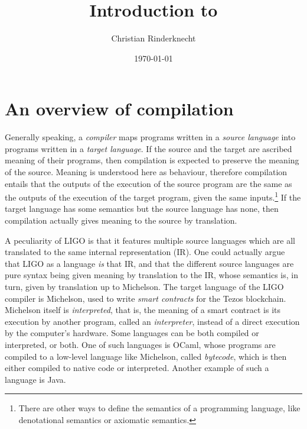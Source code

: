 \documentclass[12pt,a4paper]{article}
\title{Introduction to \ocamllex}
\author{\Large Christian Rinderknecht}
\date{\today}
\begin{document}
\maketitle


\section{An overview of compilation}

Generally speaking, a \emph{compiler} maps programs written in a
\emph{source language} into programs written in a \emph{target
  language}. If the source and the target are ascribed meaning of
their programs, then compilation is expected to preserve the meaning
of the source. Meaning is understood here as behaviour, therefore
compilation entails that the outputs of the execution of the source
program are the same as the outputs of the execution of the target
program, given the same inputs.\footnote{There are other ways to
  define the semantics of a programming language, like denotational
  semantics or axiomatic semantics.} If the target language has some
semantics but the source language has none, then compilation actually
gives meaning to the source by translation.

A peculiarity of LIGO is that it features multiple source languages
which are all translated to the same internal representation (IR). One
could actually argue that LIGO as a language \emph{is} that IR, and
that the different source languages are pure syntax being given
meaning by translation to the IR, whose semantics is, in turn, given
by translation up to Michelson. The target language of the LIGO
compiler is Michelson, used to write \emph{smart contracts} for the
Tezos blockchain. Michelson itself is \emph{interpreted}, that is, the
meaning of a smart contract is its execution by another program,
called an \emph{interpreter}, instead of a direct execution by the
computer's hardware. Some languages can be both compiled or
interpreted, or both. One of such languages is OCaml, whose programs
are compiled to a low-level language like Michelson, called
\emph{bytecode}, which is then either compiled to native code or
interpreted. Another example of such a language is Java.
\end{document}
